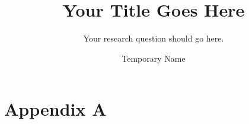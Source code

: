 \documentclass[a4paper, openany]{maatext}
\numberwithin{section}{chapter}
\numberwithin{equation}{chapter}
\begin{document}



\title{Your Title Goes Here}

\subtitle{Your research question should go here.}

\author{Temporary Name}


\maketitle

\cleardoublepage

\tableofcontents

\mainmatter%


%  






%
%

\appendix
\chapter{Appendix A}
\backmatter

\printbibliography

\end{document}
